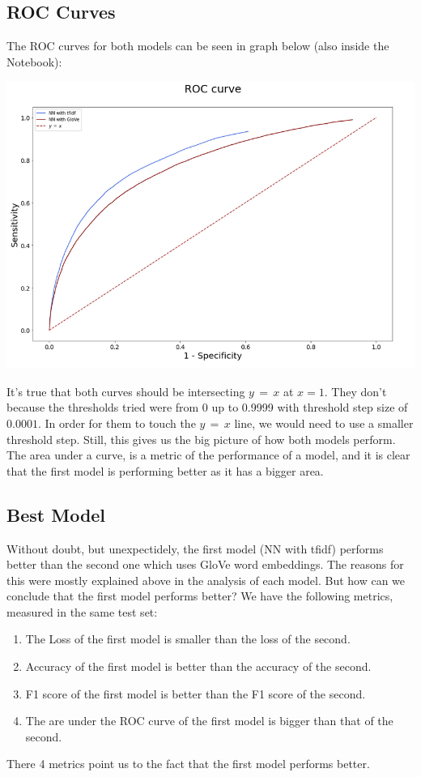 \documentclass[12pt]{report}
\begin{document}
\clearpage
\subsection*{ROC Curves}
The ROC curves for both models can be seen in graph below (also inside the Notebook):
\smallskip

\hspace*{-0.5cm}
\includegraphics[scale=0.46]{images/roc.png}
\smallskip

It's true that both curves should be intersecting $y\,=\,x$ at $x=1$. They don't because
the thresholds tried were from 0 up to 0.9999 with threshold step size of $0.0001$. In
order for them to touch the $y\,=\,x$ line, we would need to use a smaller threshold step.
Still, this gives us the big picture of how both models perform. The area under a curve,
is a metric of the performance of a model, and it is clear that the first model is
performing better as it has a bigger area.

\subsection*{Best Model}
Without doubt, but unexpectidely, the first model (NN with tfidf) performs better than
the second one which uses GloVe word embeddings. The reasons for this were mostly explained
above in the analysis of each model. But how can we conclude that the first model performs
better? We have the following metrics, measured in the same test set:
\begin{enumerate}
    \item The Loss of the first model is smaller than the loss of the second.
    \item Accuracy of the first model is better than the accuracy of the second.
    \item F1 score of the first model is better than the F1 score of the second.
    \item The are under the ROC curve of the first model is bigger than that of
        the second.
\end{enumerate}
There 4 metrics point us to the fact that the first model performs better.
\end{document}
